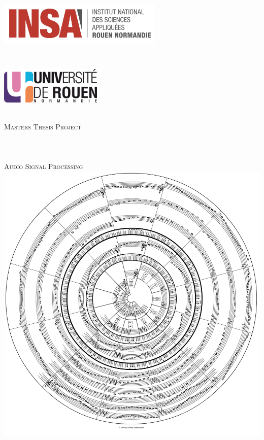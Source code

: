 \begin{titlepage}
    \begin{sffamily}
        \begin{center}
            \begin{minipage}[c]{0.45\textwidth}
            \raggedright\includegraphics[height=2cm]{img/logo_insa.png}
            \end{minipage}~\hfill~%
            \begin{minipage}[c]{0.45\textwidth}
            \raggedleft\includegraphics[height=1.75cm]{img/logo_univ.png}
            \end{minipage}\\[2cm]

            \textsc{\huge Masters Thesis Project}\\[1cm]

            \HRule \\[0.4cm]
            {\huge \bfseries \@title \\[0.4cm]}
            \HRule \\[1cm]
            
            \textsc{\huge Audio Signal Processing}\\[1cm]

            \includegraphics[width=.6\textwidth]{img/cover_img.png}~\\[2cm]


\end{center}
\end{sffamily}
\end{titlepage}
